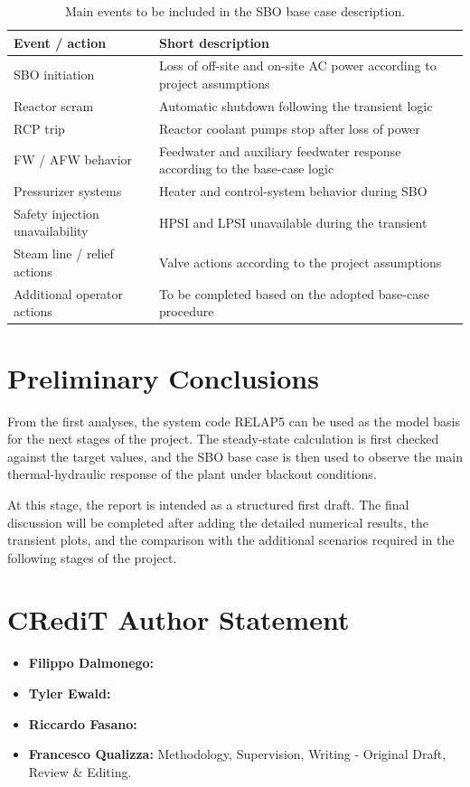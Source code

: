 \documentclass[a4paper,11pt]{article}
\numberwithin{subsubsection}{subsection}
\numberwithin{subsection}{section}
\begin{document}
\begin{table}[H]
\centering
\caption{Main events to be included in the SBO base case description.}
\label{tab:SBO_events}
\begin{tabular}{p{4.5cm} p{10.5cm}}
\toprule
\textbf{Event / action} & \textbf{Short description} \\
\midrule
SBO initiation & Loss of off-site and on-site AC power according to project assumptions \\
Reactor scram & Automatic shutdown following the transient logic \\
RCP trip & Reactor coolant pumps stop after loss of power \\
FW / AFW behavior & Feedwater and auxiliary feedwater response according to the base-case logic \\
Pressurizer systems & Heater and control-system behavior during SBO \\
Safety injection unavailability & HPSI and LPSI unavailable during the transient \\
Steam line / relief actions & Valve actions according to the project assumptions \\
Additional operator actions & To be completed based on the adopted base-case procedure \\
\bottomrule
\end{tabular}
\end{table}

\section{Preliminary Conclusions}

From the first analyses, the system code RELAP5 can be used as the model basis for the next stages of the project. The steady-state calculation is first checked against the target values, and the SBO base case is then used to observe the main thermal-hydraulic response of the plant under blackout conditions.

At this stage, the report is intended as a structured first draft. The final discussion will be completed after adding the detailed numerical results, the transient plots, and the comparison with the additional scenarios required in the following stages of the project.

\newpage

\section*{CRediT Author Statement}

\begin{itemize}
    \item \textbf{Filippo Dalmonego:} 
    \item \textbf{Tyler Ewald:} 
    \item \textbf{Riccardo Fasano:}
    \item \textbf{Francesco Qualizza:} Methodology, Supervision, Writing - Original Draft, Review \& Editing.
\end{itemize}
\end{document}
